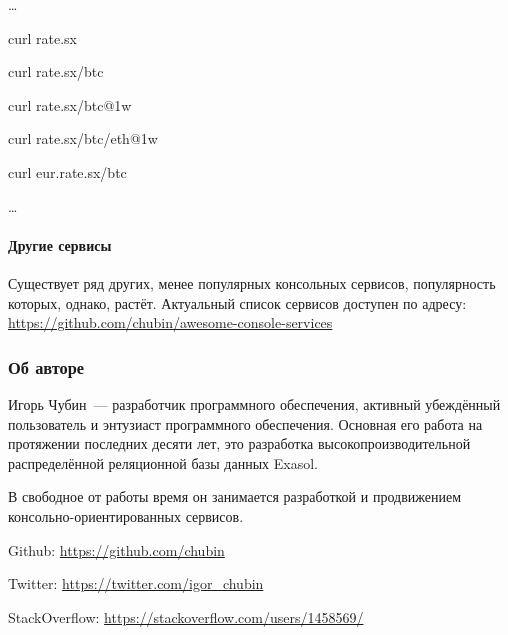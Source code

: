 \documentclass[10pt, a5paper]{article}
\begin{document}
\ldots

    curl rate.sx

    curl rate.sx/btc

    curl rate.sx/btc@1w

    curl rate.sx/btc/eth@1w

    curl eur.rate.sx/btc

\ldots

\paragraph{Другие сервисы}

Существует ряд других, менее популярных консольных сервисов, популярность которых, однако, растёт. Актуальный список сервисов доступен по адресу:  \url{https://github.com/chubin/awesome-console-services}

\subsubsection*{Об авторе}

Игорь Чубин~--- разработчик программного обеспечения, активный убеждённый пользователь и энтузиаст программного обеспечения. Основная его работа на протяжении последних десяти лет, это разработка высокопроизводительной распределённой реляционной базы данных Exasol.

В свободное от работы время он занимается разработкой и продвижением консольно-ориентированных сервисов.

Github: \url{https://github.com/chubin}

Twitter: \url{https://twitter.com/igor\_chubin}

StackOverflow: \url{https://stackoverflow.com/users/1458569/}
\end{document}
